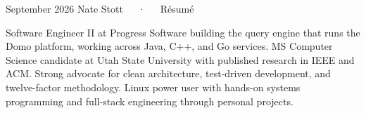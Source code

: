 \documentclass[11pt, letterpaper]{awesome-cv}
\begin{document}
\makecvheader[C]

\makecvfooter
  {September 2026}
  {Nate Stott~~~·~~~Résumé}
  {\thepage}



\begin{cvparagraph}
Software Engineer II at Progress Software building the query engine that runs the Domo platform, working across Java, C++, and Go services. MS Computer Science candidate at Utah State University with published research in IEEE and ACM. Strong advocate for clean architecture, test-driven development, and twelve-factor methodology. Linux power user with hands-on systems programming and full-stack engineering through personal projects.
\end{cvparagraph}

\end{document}

